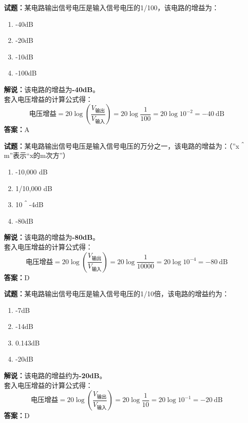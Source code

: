 \documentclass{ctexbook}
\begin{document}
\bigskip


\noindent\textbf{试题：}某电路输出信号电压是输入信号电压的1/100，该电路的增益为：
\begin{enumerate}[leftmargin=3em]
\item -40dB
\item -20dB
\item -10dB
\item -100dB
\end{enumerate}
\noindent\textbf{解说：}该电路的增益为\textbf{-40dB}。\\
套入电压增益的计算公式得：
$$\mbox{电压增益}=20 \log \left( {\frac{V_{ \mbox{输出} }}{V_{ \mbox{输入} }}} \right)=20 \log \frac{1}{100}=20 \log 10^{-2}= -40 \ \mathrm{dB}$$
\noindent\textbf{答案：}A



\bigskip


\noindent\textbf{试题：}某电路输出信号电压是输入信号电压的万分之一，该电路的增益为：（”x＾m”表示“x的m次方”）
\begin{enumerate}[leftmargin=3em]
\item -10,000 dB
\item 1/10,000 dB
\item 10＾-4dB
\item -80dB
\end{enumerate}
\noindent\textbf{解说：}该电路的增益为\textbf{-80dB}。\\
套入电压增益的计算公式得：
$$\mbox{电压增益}=20 \log \left( {\frac{V_{ \mbox{输出} }}{V_{ \mbox{输入} }}} \right)=20 \log \frac{1}{10000}=20 \log 10^{-4}= -80 \ \mathrm{dB}$$
\noindent\textbf{答案：}D



\bigskip


\noindent\textbf{试题：}某电路输出信号电压是输入信号电压的1/10倍，该电路的增益约为：
\begin{enumerate}[leftmargin=3em]
\item -7dB
\item -14dB
\item 0.143dB
\item -20dB
\end{enumerate}
\noindent\textbf{解说：}该电路的增益约为\textbf{-20dB}。\\
套入电压增益的计算公式得：
$$\mbox{电压增益}=20 \log \left( {\frac{V_{ \mbox{输出} }}{V_{ \mbox{输入} }}} \right)=20 \log \frac{1}{10}=20 \log 10^{-1}= -20 \ \mathrm{dB}$$
\noindent\textbf{答案：}D



\bigskip
\end{document}
